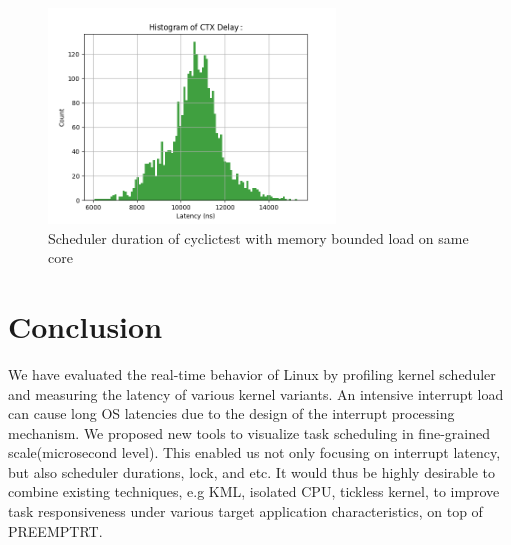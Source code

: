 \documentclass[conference]{IEEEtran}
\begin{document}
    \begin{figure} \centering \includegraphics[width=3in]{img/sd-same-no-cache.png} \caption{Scheduler duration of
    cyclictest with memory bounded load on same core} \label{fig:sd_same_no_cache} \end{figure}

\section{Conclusion}

    We have evaluated the real-time behavior of Linux by profiling kernel scheduler and measuring the latency of various
    kernel variants. An intensive interrupt load can cause long OS latencies due to the design of the interrupt
    processing mechanism. We proposed new tools to visualize task scheduling in fine-grained scale(microsecond level).
    This enabled us not only focusing on interrupt latency, but also scheduler durations, lock, and etc. It would thus
    be highly desirable to combine existing techniques, e.g KML, isolated CPU, tickless kernel, to improve task
    responsiveness under various target application characteristics, on top of PREEMPT\textunderscore RT.



\end{document}
